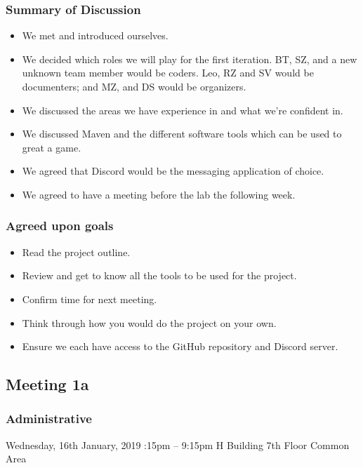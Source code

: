 \documentclass[10pt, a4paper]{article}
\begin{document}
			\subsubsection{Summary of Discussion }
			\begin{itemize}
				\item We met and introduced ourselves. 
				\item We decided which roles we will play for the first iteration. 
				BT, SZ, and a new unknown team member would be coders. 
				Leo, RZ and SV would be documenters; and MZ, and DS would be organizers. 
				\item We discussed the areas we have experience in and what we're confident in. 
				\item We discussed Maven and the different software tools which can be used to great a game.
				\item We agreed that Discord would be the messaging application of choice.   
				\item We agreed to have a meeting before the lab the following week. 
			\end{itemize}
			
			
			\subsubsection{Agreed upon goals}
			\begin{itemize}
				\item Read the project outline.
				\item Review and get to know all the tools to be used for the project.
				\item Confirm time for next meeting.
				\item Think through how you would do the project on your own. 
				\item Ensure we each have access to the GitHub repository and Discord server. 
			\end{itemize}
			
			\pagebreak
			
			\subsection{Meeting 1a }
			
			\subsubsection{Administrative}
			Wednesday, 16th January, 2019 :15pm – 9:15pm \textbar H Building 7th Floor Common Area 
\end{document}
